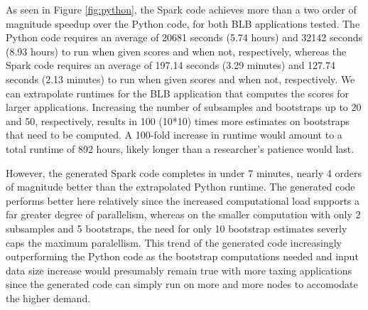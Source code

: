  As seen in Figure \ref{fig:python}, the Spark code achieves more than a two order of magnitude speedup over the Python code, for both BLB applications tested. The Python code requires an average of 20681 seconds (5.74 hours) and 32142 seconds (8.93 hours) to run when given scores and when not, respectively, whereas the Spark code requires an average of 197.14 seconds (3.29 minutes) and 127.74 seconds (2.13 minutes) to run when given scores and when not, respectively. 
 We can extrapolate runtimes for the BLB application that computes the scores for larger applications. Increasing the number of subsamples and bootstraps up to 20 and 50, respectively, results in 100 (10*10) times more estimates on bootstraps that need to be computed. A 100-fold increase in runtime would amount to a total runtime of 892 hours, likely longer than a researcher's patience would last. 

However, the generated Spark code completes in under 7 minutes, nearly 4 orders of magnitude better than the extrapolated Python runtime. The generated code performs better here relatively since the increased computational load supports a far greater degree of parallelism, whereas on the smaller computation with only 2 subsamples and 5 bootstraps, the need for only 10 bootstrap estimates severly caps the maximum paralellism. This trend of the generated code increasingly outperforming the Python code as the bootstrap computations needed and input data size increase would presumably remain true with more taxing applications since the generated code can simply run on more and more nodes to accomodate the higher demand. 



